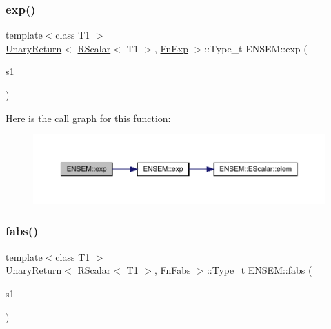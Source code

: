 \subsubsection{\texorpdfstring{exp()}{exp()}}
{\footnotesize\ttfamily template$<$class T1 $>$ \\
\mbox{\hyperlink{structENSEM_1_1UnaryReturn}{Unary\+Return}}$<$ \mbox{\hyperlink{classENSEM_1_1RScalar}{R\+Scalar}}$<$ T1 $>$, \mbox{\hyperlink{structENSEM_1_1FnExp}{Fn\+Exp}} $>$\+::Type\+\_\+t E\+N\+S\+E\+M\+::exp (\begin{DoxyParamCaption}\item[{const \mbox{\hyperlink{classENSEM_1_1RScalar}{R\+Scalar}}$<$ T1 $>$ \&}]{s1 }\end{DoxyParamCaption})\hspace{0.3cm}{\ttfamily [inline]}}

Here is the call graph for this function\+:\nopagebreak
\begin{figure}[H]
\begin{center}
\leavevmode
\includegraphics[width=350pt]{d9/ded/group__rscalar_ga7555010fd1580f0b6a1d85cd4e925ce1_cgraph}
\end{center}
\end{figure}
\mbox{\label{group__rscalar_ga4f8b1e156677c7d98bb51e70915b9239}} 
\subsubsection{\texorpdfstring{fabs()}{fabs()}}
{\footnotesize\ttfamily template$<$class T1 $>$ \\
\mbox{\hyperlink{structENSEM_1_1UnaryReturn}{Unary\+Return}}$<$ \mbox{\hyperlink{classENSEM_1_1RScalar}{R\+Scalar}}$<$ T1 $>$, \mbox{\hyperlink{structENSEM_1_1FnFabs}{Fn\+Fabs}} $>$\+::Type\+\_\+t E\+N\+S\+E\+M\+::fabs (\begin{DoxyParamCaption}\item[{const \mbox{\hyperlink{classENSEM_1_1RScalar}{R\+Scalar}}$<$ T1 $>$ \&}]{s1 }\end{DoxyParamCaption})\hspace{0.3cm}{\ttfamily [inline]}}

